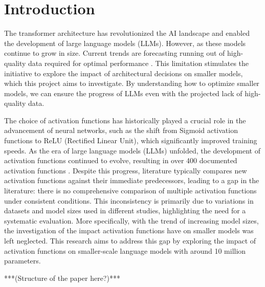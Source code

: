 
\section{Introduction}


The transformer architecture \cite{Vaswani2017} has revolutionized the AI landscape and enabled the development of large language models (LLMs). However, as these models continue to grow in size. Current trends are forecasting running out of high-quality data required for optimal performance \cite{Villalobos2022}. This limitation stimulates the initiative to explore the impact of architectural decisions on smaller models, which this project aims to investigate. By understanding how to optimize smaller models, we can ensure the progress of LLMs even with the projected lack of high-quality data.

The choice of activation functions has historically played a crucial role in the advancement of neural networks, such as the shift from Sigmoid activation functions to ReLU (Rectified Linear Unit), which significantly improved training speeds. As the era of large language models (LLMs) unfolded, the development of activation functions continued to evolve, resulting in over 400 documented activation functions \cite{Kunc2024}. Despite this progress, literature typically compares new activation functions against their immediate predecessors, leading to a gap in the literature: there is no comprehensive comparison of multiple activation functions under consistent conditions. This inconsistency is primarily due to variations in datasets and model sizes used in different studies, highlighting the need for a systematic evaluation. More specifically, with the trend of increasing model sizes, the investigation of the impact activation functions have on smaller models was left neglected. This research aims to address this gap by exploring the impact of activation functions on smaller-scale language models with around 10 million parameters.

***(Structure of the paper here?)***